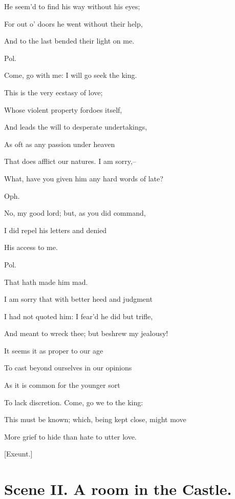 \documentclass[12pt]{book}
\begin{document}
He seem'd to find his way without his eyes;

For out o' doors he went without their help,

And to the last bended their light on me.



Pol.

Come, go with me: I will go seek the king.

This is the very ecstasy of love;

Whose violent property fordoes itself,

And leads the will to desperate undertakings,

As oft as any passion under heaven

That does afflict our natures. I am sorry,--

What, have you given him any hard words of late?



Oph.

No, my good lord; but, as you did command,

I did repel his letters and denied

His access to me.



Pol.

That hath made him mad.

I am sorry that with better heed and judgment

I had not quoted him: I fear'd he did but trifle,

And meant to wreck thee; but beshrew my jealousy!

It seems it as proper to our age

To cast beyond ourselves in our opinions

As it is common for the younger sort

To lack discretion. Come, go we to the king:

This must be known; which, being kept close, might move

More grief to hide than hate to utter love.



[Exeunt.]







\section*{Scene II. A room in the Castle.}
\end{document}
